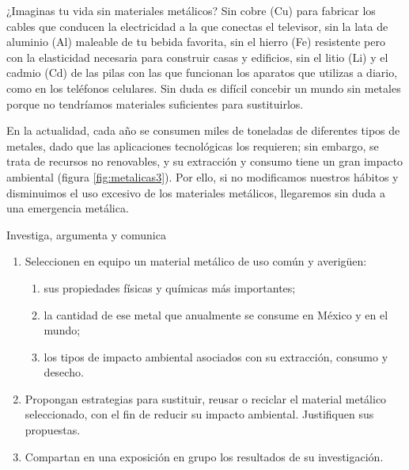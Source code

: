 \documentclass[11pt]{book}
\begin{document}
¿Imaginas tu vida sin materiales metálicos? Sin cobre (Cu) para fabricar los cables que conducen la
electricidad a la que conectas el televisor, sin la lata de aluminio (Al) maleable de tu bebida
favorita, sin el hierro (Fe) resistente pero con la elasticidad necesaria para construir casas y
edificios, sin el litio (Li) y el cadmio (Cd) de las pilas con las que funcionan los aparatos que
utilizas a diario, como en los teléfonos celulares. Sin duda es difícil concebir un mundo sin metales
porque no tendríamos materiales suficientes para sustituirlos.

En la actualidad, cada año se consumen miles de toneladas de diferentes tipos de metales,
dado que las aplicaciones tecnológicas los requieren; sin embargo, se trata de recursos
no renovables, y su extracción y consumo tiene un gran impacto ambiental (figura \ref{fig:metalicas3}).
Por ello, si no modificamos nuestros hábitos y disminuimos el uso excesivo de los materiales metálicos,
llegaremos sin duda a una emergencia metálica.

\begin{boxK}
  Investiga, argumenta y comunica
  \begin{enumerate}
    \item Seleccionen en equipo un material metálico de uso común y averigüen:
          \begin{enumerate}
            \item sus propiedades físicas y químicas más importantes;
            \item la cantidad de ese metal que anualmente se consume en México y en el mundo;
            \item los tipos de impacto ambiental asociados con su extracción, consumo y desecho.
          \end{enumerate}
    \item Propongan estrategias para sustituir, reusar o reciclar el material metálico seleccionado,
          con el fin de reducir su impacto ambiental. Justifiquen sus propuestas.
    \item Compartan en una exposición en grupo los resultados de su investigación.
  \end{enumerate}
\end{boxK}
\end{document}
